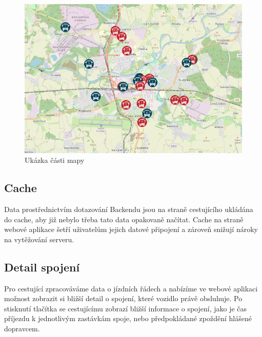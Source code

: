\begin{figure}[H]
    \centering
    \includegraphics[width=1\textwidth]{images/Screenshot from 2023-03-18 20-15-00.png}
    \caption{Ukázka části mapy}
    \label{mapa}
\end{figure}
\subsection{Cache}
Data prostřednictvím dotazování Backendu jsou na straně cestujícího ukládána do cache, aby již nebylo třeba tato data opakovaně načítat.
Cache na straně webové aplikace šetří uživatelům jejich datové připojení a zároveň snižují nároky na vytěžování serveru.

\subsection{Detail spojení}
Pro cestující zpracováváme data o jízdních řádech a nabízíme ve webové aplikaci možnost zobrazit si bližší detail o spojení, které vozidlo právě obsluhuje.
Po stisknutí tlačítka se cestujícímu zobrazí bližší informace o spojení, jako je čas příjezdu k jednotlivým zastávkám spoje, nebo předpokládané zpoždění hlášené dopravcem.

